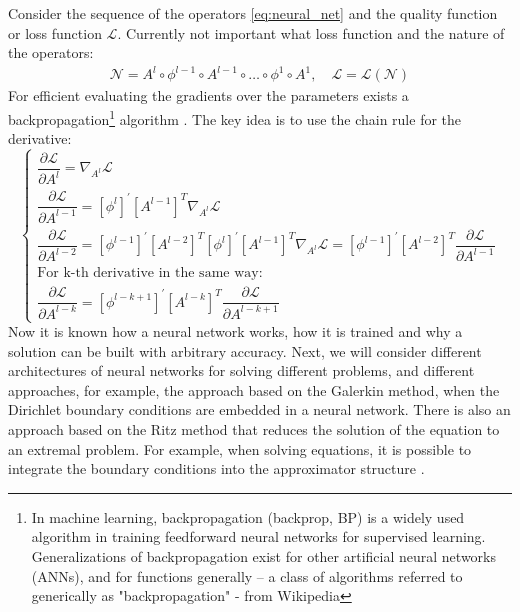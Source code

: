 Consider the sequence of the operators \eqref{eq:neural_net} and the quality function or loss function $\mathcal{L}$. Currently not important what loss function and the nature of the operators:
\begin{equation*}
	\begin{multlined}
		\mathcal{N} = A^l \circ \phi^{l - 1} \circ A^{l - 1} \circ \dots \circ \phi^1 \circ A^1, \quad \mathcal{L} = \mathcal{L} \left ( \mathcal{N} \right )
	\end{multlined}
\end{equation*}
For efficient evaluating the gradients over the parameters exists a backpropagation\footnote{
	In machine learning, backpropagation (backprop, BP) is a widely used algorithm in training feedforward neural networks for supervised learning. Generalizations of backpropagation exist for other artificial neural networks (ANNs), and for functions generally – a class of algorithms referred to generically as "backpropagation" - from Wikipedia
} algorithm \cite{chauvin2013backpropagation}. The key idea is to use the chain rule for the derivative:
\begin{equation*}
	\begin{cases}
		\dfrac{\partial \mathcal{L}}{\partial A^l} = \nabla_{A^l}\mathcal{L} \\[10pt]
		\dfrac{\partial \mathcal{L}}{\partial A^{l - 1}} = \left [ \phi^l \right ]^{'} \left [ A^{l - 1} \right ]^T \nabla_{A^l}\mathcal{L} \\[10pt]
		\dfrac{\partial \mathcal{L}}{\partial A^{l - 2}} = \left [ \phi^{l - 1} \right ]^{'} \left [ A^{l - 2} \right ]^T  \left [ \phi^l \right ]^{'} \left [ A^{l - 1} \right ]^T \nabla_{A^l}\mathcal{L} =  \left [ \phi^{l - 1} \right ]^{'} \left [ A^{l - 2} \right ]^T  \dfrac{\partial \mathcal{L}}{\partial A^{l - 1}} \\[10pt] 
		\text{For k-th derivative in the same way:} \\[10pt]
		\dfrac{\partial \mathcal{L}}{\partial A^{l - k}} = \left [ \phi^{l - k + 1} \right ]^{'} \left [ A^{l - k} \right ]^T  \dfrac{\partial \mathcal{L}}{\partial A^{l - k + 1}}
	\end{cases} 
\end{equation*}
Now it is known how a neural network works, how it is trained and why a solution can be built with arbitrary accuracy. Next, we will consider different architectures of neural networks for solving different problems, and different approaches, for example, the approach based on the Galerkin method, when the Dirichlet boundary conditions are embedded in a neural network. There is also an approach based on the Ritz method that reduces the solution of the equation to an extremal problem. For example, when solving equations, it is possible to integrate the boundary conditions into the approximator structure \cite{Lagaris_1998} \cite{liu2019solving}.

